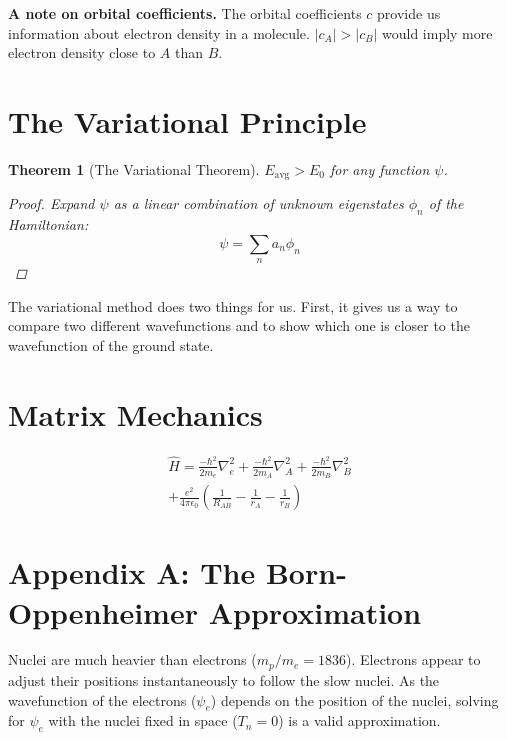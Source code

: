 \documentclass[a4paper]{tufte-handout}
\newtheorem{theorem}{Theorem}
\theoremstyle{definition}
\begin{document}
\textbf{A note on orbital coefficients.} The orbital coefficients $c$ provide us information
about electron density in a molecule. $|c_A| > |c_B|$ would imply more electron density close
to $A$ than $B$.

\section{The Variational Principle}

\begin{theorem}[The Variational Theorem] $E_{\mathrm{avg}} > E_0$ for any function $\psi$. 

  \begin{proof}
    Expand $\psi$ as a linear combination of unknown eigenstates $\phi_n$ of the Hamiltonian:
    \begin{equation*}
      \psi = \sum_n a_n \phi_n
    \end{equation*}
  \end{proof}
  
\end{theorem}

The variational method does two things for us. First, it gives us a way to compare two 
different wavefunctions and to show which one is closer to the wavefunction of the ground state. 

\section{Matrix Mechanics}

\begin{align}
  \hat{H} = \frac{-\hbar^2}{2m_e}\nabla^2_e + \frac{-\hbar^2}{2m_A}\nabla^2_A + \frac{-\hbar^2}{2m_B}\nabla^2_B \\
  + \frac{e^2}{4\pi\epsilon_0} \left( \frac{1}{R_{AB}} - \frac{1}{r_{A}} - \frac{1}{r_{B}} \right)
\end{align}

\section{Appendix A: The Born-Oppenheimer Approximation}

Nuclei are much heavier than electrons ($m_p / m_e = 1836$). Electrons appear to adjust their positions instantaneously to follow the slow nuclei.
As the wavefunction of the electrons ($\psi_e$) depends on the position of the nuclei, solving for $\psi_e$ with the nuclei fixed in space ($T_n = 0$) is a valid approximation.
\end{document}
